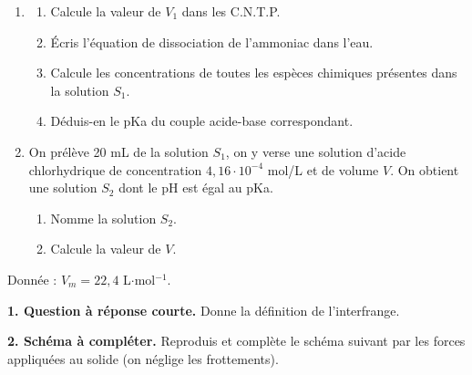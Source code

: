 \documentclass[11pt]{article}
\begin{document}
\begin{enumerate}
  \item \begin{enumerate}[label=\alph*.]
    \item Calcule la valeur de $V_1$ dans les C.N.T.P.
    \item Écris l'équation de dissociation de l'ammoniac dans l'eau.
    \item Calcule les concentrations de toutes les espèces chimiques présentes dans la solution $S_1$.
    \item Déduis-en le pKa du couple acide-base correspondant.
  \end{enumerate}
  \item On prélève 20 mL de la solution $S_1$, on y verse une solution d'acide chlorhydrique de concentration $4{,}16\cdot10^{-4}$ mol/L et de volume $V$. On obtient une solution $S_2$ dont le pH est égal au pKa.
  \begin{enumerate}[label=\alph*.]
    \item Nomme la solution $S_2$.
    \item Calcule la valeur de $V$.
  \end{enumerate}
\end{enumerate}
\noindent Donnée : $V_m = 22{,}4$ L$\cdot$mol$^{-1}$.



\noindent\textbf{1. Question à réponse courte.} Donne la définition de l'interfrange.

\medskip
\noindent\textbf{2. Schéma à compléter.} Reproduis et complète le schéma suivant par les forces appliquées au solide (on néglige les frottements).

\begin{center}
\end{center}
\end{document}
